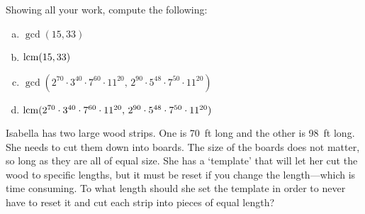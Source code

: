 \documentclass[11pt,letterpaper]{article}
\begin{document}
\newpage



 Showing all your work, compute the following:
	\begin{enumerate}[(a)]
	\item $\gcd(15, 33)$
	\item $\operatorname{lcm}(15, 33)$
	\item $\gcd(2^{70} \cdot 3^{40} \cdot 7^{60} \cdot 11^{20},\, 2^{90} \cdot 5^{48} \cdot 7^{50} \cdot 11^{20})$
	\item $\operatorname{lcm}(2^{70} \cdot 3^{40} \cdot 7^{60} \cdot 11^{20},\, 2^{90} \cdot 5^{48} \cdot 7^{50} \cdot 11^{20})$
	\end{enumerate} 



\newpage



 Isabella has two large wood strips. One is 70~ft long and the other is 98~ft long. She needs to cut them down into boards. The size of the boards does not matter, so long as they are all of equal size. She has a `template' that will let her cut the wood to specific lengths, but it must be reset if you change the length---which is time consuming. To what length should she set the template in order to never have to reset it and cut each strip into pieces of equal length? 
\end{document}
